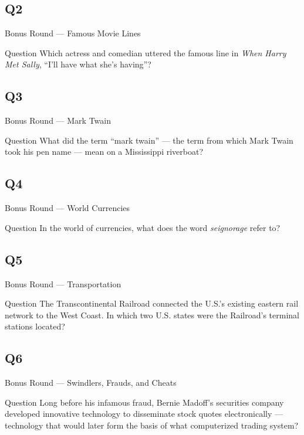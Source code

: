 \documentclass[11pt]{beamer}
\begin{document}
\subsection*{Q2}
\begin{frame}[t]{Bonus Round --- Famous Movie Lines}
\vspace{-0.5em}
\begin{block}{Question}
Which actress and comedian uttered the famous line in \emph{When Harry Met Sally}, ``I'll have what she's having''?
\end{block}
\end{frame}
\subsection*{Q3}
\begin{frame}[t]{Bonus Round --- Mark Twain}
\vspace{-0.5em}
\begin{block}{Question}
What did the term ``mark twain'' --- the term from which Mark Twain took his pen name --- mean on a Mississippi riverboat?
\end{block}
\end{frame}
\subsection*{Q4}
\begin{frame}[t]{Bonus Round --- World Currencies}
\vspace{-0.5em}
\begin{block}{Question}
In the world of currencies, what does the word \emph{seignorage} refer to?
\end{block}
\end{frame}
\subsection*{Q5}
\begin{frame}[t]{Bonus Round --- Transportation}
\vspace{-0.5em}
\begin{block}{Question}
The Transcontinental Railroad connected the U.S.'s existing eastern rail network to the West Coast. In which two U.S. states were the Railroad's terminal stations located?
\end{block}
\end{frame}
\subsection*{Q6}
\begin{frame}[t]{Bonus Round --- Swindlers, Frauds, and Cheats}
\vspace{-0.5em}
\begin{block}{Question}
Long before his infamous fraud, Bernie Madoff's securities company developed innovative technology to disseminate stock quotes electronically --- technology that would later form the basis of what computerized trading system?
\end{block}
\end{frame}
\end{document}
